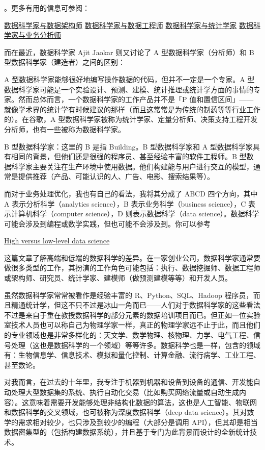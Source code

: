 \documentclass[10pt,a4paper]{ctexbook}
\begin{document}
。更多有用的信息可参阅：

\href{http://suo.im/4bRkRG}{数据科学家与数据架构师}
\href{http://suo.im/3mpo6E}{数据科学家与数据工程师}
\href{http://suo.im/2GGtfG}{数据科学家与统计学家}
\href{http://suo.im/3h0hkX}{数据科学家与业务分析师}


而在最近，数据科学家 Ajit Jaokar 则又讨论了 A 型数据科学家（分析师）和 B 型数据科学家（建造者）之间的区别：

A 型数据科学家能够很好地编写操作数据的代码，但并不一定是一个专家。A 型数据科学家可能是一个实验设计、预测、建模、统计推理或统计学方面的事情的专家。然而总体而言，一个数据科学家的工作产品并不是「P 值和置信区间」——就像学术界的统计学有时候建议的那样（而且这常常是为传统的制药等等行业工作的）。在谷歌，A 型数据科学家被称为统计学家、定量分析师、决策支持工程开发分析师，也有一些被称为数据科学家。

B 型数据科学家：这里的 B 是指 Building。B 型数据科学家和 A 型数据科学家具有相同的背景，但他们还是很强的程序员、甚至经验丰富的软件工程师。B 型数据科学家主要关注在生产环境中使用数据。他们构建能与用户进行交互的模型，通常是提供推荐（产品、可能认识的人、广告、电影、搜索结果等）。

而对于业务处理优化，我也有自己的看法，我将其分成了 ABCD 四个方向，其中 A 表示分析科学（analytics science），B 表示业务科学（business science），C 表示计算机科学（computer science），D 则表示数据科学（data science）。数据科学可能会涉及到编程或数学实践，但也可能不会涉及到。你可以参考

\href{http://suo.im/11bR7o}{High versus low-level data science}

这篇文章了解高端和低端的数据科学的差异。在一家创业公司，数据科学家通常要做很多类型的工作，其扮演的工作角色可能包括：执行、数据挖掘师、数据工程师或架构师、研究员、统计学家、建模师（做预测建模等等）和开发人员。

虽然数据科学家常常被看作是经验丰富的 R、Python、SQL、Hadoop 程序员，而且精通统计学，但这不只不过是冰山一角而已——人们对于数据科学家的这些看法不过是来自于重在教授数据科学的部分元素的数据培训项目而已。但正如一位实验室技术人员也可以称自己为物理学家一样，真正的物理学家远不止于此，而且他们的专业领域也是非常多样化的：天文学、数学物理、核物理、力学、电气工程、信号处理（这也是数据科学的一个领域）等等许多。数据科学也是一样，包含的领域有：生物信息学、信息技术、模拟和量化控制、计算金融、流行病学、工业工程、甚至数论。

对我而言，在过去的十年里，我专注于机器到机器和设备到设备的通信、开发能自动处理大型数据集的系统、执行自动化交易（比如购买网络流量或自动生成内容）。这意味着需要开发能够处理非结构化数据的算法，这也是人工智能、物联网和数据科学的交叉领域，也可被称为深度数据科学（deep data science）。其对数学的需求相对较少，也只涉及到较少的编程（大部分是调用 API），但其却是相当数据密集型的（包括构建数据系统），并且基于专门为此背景而设计的全新统计技术。
\end{document}
